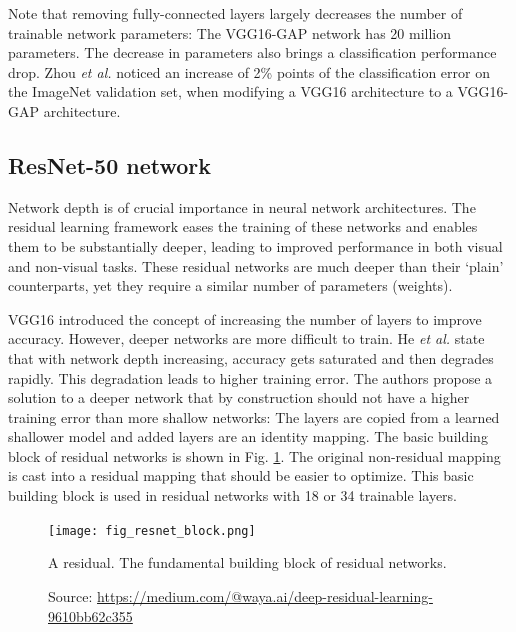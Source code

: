 Note that removing fully-connected layers largely decreases the number of trainable network parameters: The VGG16-GAP network has 20 million parameters. The decrease in parameters also brings a classification performance drop. Zhou \textit{et al.} noticed an increase of 2\% points of the classification error on the ImageNet validation set, when modifying a VGG16 architecture to a VGG16-GAP architecture. 

\subsection{ResNet-50 network}
Network depth is of crucial importance in neural network architectures. The residual learning framework eases the training of these networks and enables them to be substantially deeper, leading to improved performance in both visual and non-visual tasks. These residual networks are much deeper than their ‘plain’ counterparts, yet they require a similar number of parameters (weights).

VGG16 introduced the concept of increasing the number of layers to improve accuracy. However, deeper networks are more difficult to train. He \textit{et al.} \cite{he2016deep} state that with network depth increasing, accuracy gets saturated and then degrades rapidly. This degradation leads to higher training error. The authors propose a solution to a deeper network that by construction should not have a higher training error than more shallow networks: The layers are copied from a learned shallower model and added layers are an identity mapping. The basic building block of residual networks is shown in Fig. \ref{fig:resnet_block}. The original non-residual mapping is cast into a residual mapping that should be easier to optimize. This basic building block is used in residual networks with 18 or 34 trainable layers. 
\begin{figure}[ht]
    \begin{center}       
    \texttt{[image: fig\_resnet\_block.png]}
    \caption[Residual block]{A residual. The fundamental building block of residual networks.}
    \caption*{Source: \href{https://medium.com/@waya.ai/deep-residual-learning-9610bb62c355}{https://medium.com/@waya.ai/deep-residual-learning-9610bb62c355}}
    \label{fig:resnet_block}
    \end{center}
\end{figure}

